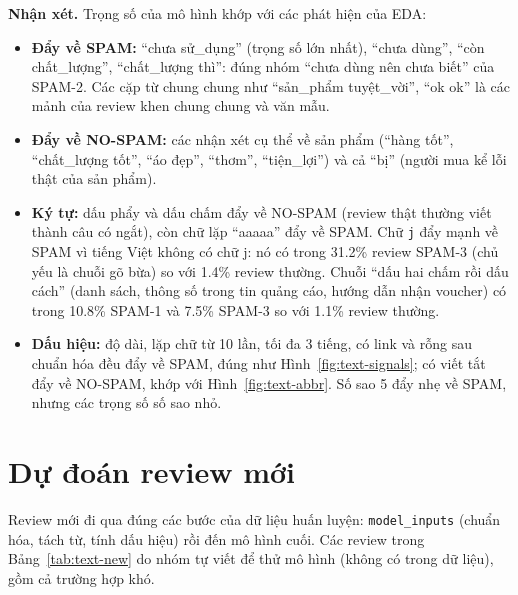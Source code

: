 \textbf{Nhận xét.} Trọng số của mô hình khớp với các phát hiện của EDA:
\begin{itemize}[leftmargin=1.5cm]
    \item \textbf{Đẩy về SPAM:} ``chưa sử\_dụng'' (trọng số lớn nhất), ``chưa dùng'', ``còn chất\_lượng'', ``chất\_lượng thì'': đúng nhóm ``chưa dùng nên chưa biết''
          của SPAM-2. Các cặp từ chung chung như ``sản\_phẩm tuyệt\_vời'', ``ok ok'' là các mảnh của review khen chung chung và văn mẫu.
    \item \textbf{Đẩy về NO-SPAM:} các nhận xét cụ thể về sản phẩm (``hàng tốt'', ``chất\_lượng tốt'', ``áo đẹp'', ``thơm'', ``tiện\_lợi'') và cả ``bị''
          (người mua kể lỗi thật của sản phẩm).
    \item \textbf{Ký tự:} dấu phẩy và dấu chấm đẩy về NO-SPAM (review thật thường viết thành câu có ngắt), còn chữ lặp ``aaaaa'' đẩy về SPAM.
          Chữ \texttt{j} đẩy mạnh về SPAM vì tiếng Việt không có chữ j: nó có trong 31.2\% review SPAM-3 (chủ yếu là chuỗi gõ bừa) so với 1.4\% review thường.
          Chuỗi ``dấu hai chấm rồi dấu cách'' (danh sách, thông số trong tin quảng cáo, hướng dẫn nhận voucher) có trong 10.8\% SPAM-1 và 7.5\% SPAM-3 so với 1.1\% review thường.
    \item \textbf{Dấu hiệu:} độ dài, lặp chữ từ 10 lần, tối đa 3 tiếng, có link và rỗng sau chuẩn hóa đều đẩy về SPAM, đúng như Hình~\ref{fig:text-signals};
          có viết tắt đẩy về NO-SPAM, khớp với Hình~\ref{fig:text-abbr}. Số sao 5 đẩy nhẹ về SPAM, nhưng các trọng số số sao nhỏ.
\end{itemize}

\section{Dự đoán review mới}
Review mới đi qua đúng các bước của dữ liệu huấn luyện: \texttt{model\_inputs} (chuẩn hóa, tách từ, tính dấu hiệu) rồi đến mô hình cuối.
Các review trong Bảng~\ref{tab:text-new} do nhóm tự viết để thử mô hình (không có trong dữ liệu), gồm cả trường hợp khó.

